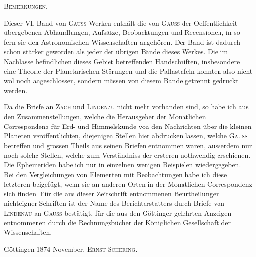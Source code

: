 \clearpage
{}
\hypertarget{native-659-lower}{}
\begin{center}\textsc{Bemerkungen.}\end{center}

Dieser VI. Band von \textsc{Gauss} Werken enthält die von \textsc{Gauss} der Oeffentlichkeit übergebenen Abhandlungen, Aufsätze, Beobachtungen und Recensionen, in so fern sie den Astronomischen Wissenschaften angehören. Der Band ist dadurch schon stärker geworden als jeder der übrigen Bände dieses Werkes. Die im Nachlasse befindlichen dieses Gebiet betreffenden Handschriften, insbesondere eine Theorie der Planetarischen Störungen und die Pallastafeln konnten also nicht wol noch angeschlossen, sondern müssen von diesem Bande getrennt gedruckt werden.

Da die Briefe an \textsc{Zach} und \textsc{Lindenau} nicht mehr vorhanden sind, so habe ich aus den Zusammenstellungen, welche die Herausgeber der Monatlichen Correspondenz für Erd- und Himmelskunde von den Nachrichten über die kleinen Planeten veröffentlichten, diejenigen Stellen hier abdrucken lassen, welche \textsc{Gauss} betreffen und grossen Theils aus seinen Briefen entnommen waren, ausserdem nur noch solche Stellen, welche zum Verständniss der ersteren nothwendig erschienen. Die Ephemeriden habe ich nur in einzelnen wenigen Beispielen wiedergegeben. Bei den Vergleichungen von Elementen mit Beobachtungen habe ich diese letzteren beigefügt, wenn sie an anderen Orten in der Monatlichen Correspondenz sich finden. Für die aus dieser Zeitschrift entnommenen Beurtheilungen nichteigner Schriften ist der Name des Berichterstatters durch Briefe von \textsc{Lindenau} an \textsc{Gauss} bestätigt, für die aus den Göttinger gelehrten Anzeigen entnommenen durch die Rechnungsbücher der Königlichen Gesellschaft der Wissenschaften.

Göttingen 1874 November. \hfill \textsc{Ernst Schering}.
